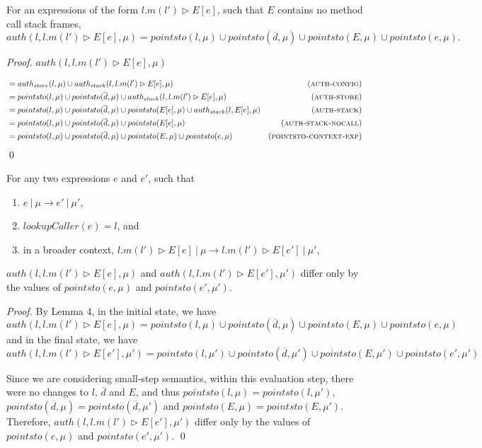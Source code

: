 \documentclass{llncs}
\begin{document}
\begin{lemma}
For an expressions of the form $l.m(l') \rhd E[e]$, such that $E$ contains no method call stack frames,
\[
auth(l, l.m(l') \rhd E[e], \mu) = pointsto(l, \mu) \cup pointsto(\overline{d}, \mu) \cup pointsto(E, \mu) \cup pointsto(e, \mu).
\]
\end{lemma}

\begin{proof} $auth(l, l.m(l') \rhd E[e], \mu)$

\vspace{-17pt}

\begin{align*}
&= auth_{store}(l, \mu) \cup auth_{stack}(l, l.m(l') \rhd E[e], \mu) & (\textsc{auth-config})\\
&= pointsto(l, \mu) \cup pointsto(\overline{d}, \mu) \cup auth_{stack}(l, l.m(l') \rhd E[e], \mu) & (\textsc{auth-store})\\
&= pointsto(l, \mu) \cup pointsto(\overline{d}, \mu) \cup pointsto(E[e], \mu) \cup auth_{stack}(l, E[e], \mu) & (\textsc{auth-stack})\\
&= pointsto(l, \mu) \cup pointsto(\overline{d}, \mu) \cup pointsto(E[e], \mu) & (\textsc{auth-stack-nocall})\\
&= pointsto(l, \mu) \cup pointsto(\overline{d}, \mu) \cup pointsto(E, \mu) \cup pointsto(e, \mu) & (\textsc{pointsto-context-exp})
\end{align*}\qed

\end{proof}


\begin{lemma}
For any two expressions $e$ and $e'$, such that
\begin{enumerate}
\item $e~|~\mu \longrightarrow e'~|~\mu'$,
\item $lookupCaller(e) = l$, and
\item in a broader context, $l.m(l') \rhd E[e]~|~\mu \longrightarrow l.m(l') \rhd E[e']~|~\mu'$,
\end{enumerate}
$auth(l, l.m(l') \rhd E[e], \mu)$ and $auth(l, l.m(l') \rhd E[e'], \mu')$ differ only by the values of $pointsto(e, \mu)$ and $pointsto(e', \mu')$.
\end{lemma}

\begin{proof} By Lemma 4, in the initial state, we have
\[
auth(l, l.m(l') \rhd E[e], \mu) = pointsto(l, \mu) \cup pointsto(\overline{d}, \mu) \cup pointsto(E, \mu) \cup pointsto(e, \mu)
\]
and in the final state, we have
\[
auth(l, l.m(l') \rhd E[e'], \mu') = pointsto(l, \mu') \cup pointsto(\overline{d}, \mu') \cup pointsto(E, \mu') \cup pointsto(e', \mu')
\]

Since we are considering small-step semantics, within this evaluation step, there were no changes to $l$, $\overline{d}$ and $E$, and thus $pointsto(l, \mu) = pointsto(l, \mu')$, $pointsto(\overline{d}, \mu) = pointsto(\overline{d}, \mu')$ and $pointsto(E, \mu) = pointsto(E, \mu')$. Therefore, $auth(l, l.m(l') \rhd E[e'], \mu')$ differ only by the values of $pointsto(e, \mu)$ and $pointsto(e', \mu')$. \qed

\end{proof}
\end{document}

